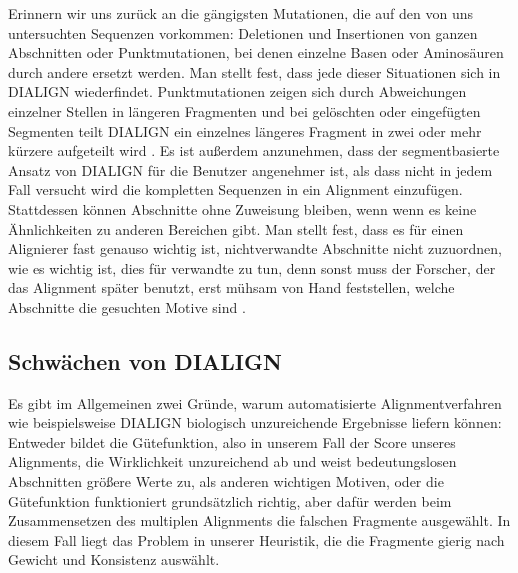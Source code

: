 Erinnern wir uns zurück an die gängigsten Mutationen, die auf den von uns untersuchten Sequenzen vorkommen: Deletionen und Insertionen von ganzen Abschnitten oder Punktmutationen, bei denen einzelne Basen oder Aminosäuren durch andere ersetzt werden. Man stellt fest, dass jede dieser Situationen sich in DIALIGN wiederfindet. Punktmutationen zeigen sich durch Abweichungen einzelner Stellen in längeren Fragmenten und bei gelöschten oder eingefügten Segmenten teilt DIALIGN ein einzelnes längeres Fragment in zwei oder mehr kürzere aufgeteilt wird \cite{mfdw98}. Es ist außerdem anzunehmen, dass der segmentbasierte Ansatz von DIALIGN für die Benutzer angenehmer ist, als dass nicht in jedem Fall versucht wird die kompletten Sequenzen in ein Alignment einzufügen. Stattdessen können Abschnitte ohne Zuweisung bleiben, wenn wenn es keine Ähnlichkeiten zu anderen Bereichen gibt. Man stellt fest, dass es für einen Alignierer fast genauso wichtig ist, nichtverwandte Abschnitte nicht zuzuordnen, wie es wichtig ist, dies für verwandte zu tun, denn sonst muss der Forscher, der das Alignment später benutzt, erst mühsam von Hand feststellen, welche Abschnitte die gesuchten Motive sind \cite{m99}.

\subsection{Schwächen von DIALIGN}\label{subsec:schwaechen}

Es gibt im Allgemeinen zwei Gründe, warum automatisierte Alignmentverfahren wie beispielsweise DIALIGN biologisch unzureichende Ergebnisse liefern können: Entweder bildet die Gütefunktion, also in unserem Fall der Score unseres Alignments, die Wirklichkeit unzureichend ab und weist bedeutungslosen Abschnitten größere Werte zu, als anderen wichtigen Motiven, oder die Gütefunktion funktioniert grundsätzlich richtig, aber dafür werden beim Zusammensetzen des multiplen Alignments die falschen Fragmente ausgewählt. In diesem Fall liegt das Problem in unserer Heuristik, die die Fragmente gierig nach Gewicht und Konsistenz auswählt. 

